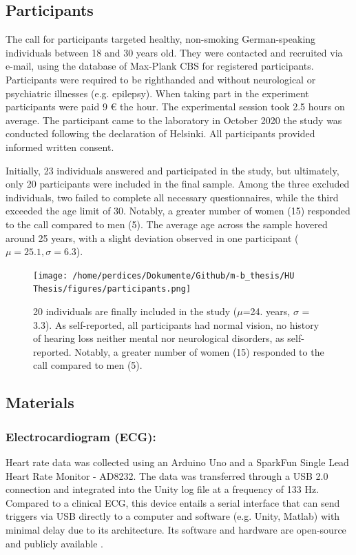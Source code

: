 \documentclass[12pt,oneside,openright]{report}
\begin{document}
\subsection*{Participants}
The call for participants targeted healthy, non-smoking German-speaking individuals between 18 and 30 years old. They were contacted and recruited via e-mail, using the database of Max-Plank CBS for registered participants. Participants were required to be righthanded and without neurological or psychiatric illnesses (e.g. epilepsy). When taking part in the experiment participants were paid 9 € the hour. The experimental session took 2.5 hours on average. The participant came to the laboratory in October 2020 the study was conducted following the declaration of Helsinki. All participants provided informed written consent. 

Initially, 23 individuals answered and participated in the study, but ultimately, only 20 participants were included in the final sample. Among the three excluded individuals, two failed to complete all necessary questionnaires, while the third exceeded the age limit of 30. Notably, a greater number of women (15) responded to the call compared to men (5). The average age across the sample hovered around 25 years, with a slight deviation observed in one participant ($\mu=25.1, \sigma=6.3$).

\begin{figure}[h]
    \centering
    \texttt{[image: /home/perdices/Dokumente/Github/m-b\_thesis/HU Thesis/figures/participants.png]}
    \caption{20 individuals are finally included in the study (\(\mu\)=24. years, \(\sigma\) = 3.3). As self-reported, all participants had normal vision, no history of hearing loss neither mental nor neurological disorders, as self-reported. Notably, a greater number of women (15) responded to the call compared to men (5).}
    \label{fig:mesh1}
\end{figure}

    
\subsection*{Materials}

\subsubsection*{Electrocardiogram (ECG):}
Heart rate data was collected using an Arduino Uno and a SparkFun Single Lead Heart Rate Monitor - AD8232. The data was transferred through a USB 2.0 connection and integrated into the Unity log file at a frequency of 133 Hz. Compared to a clinical ECG, this device entails a serial interface that can send triggers via USB directly to a computer and software (e.g. Unity, Matlab) with minimal delay due to its architecture. Its software and hardware are open-source and publicly available \parencite{TimsECG}.
\end{document}
